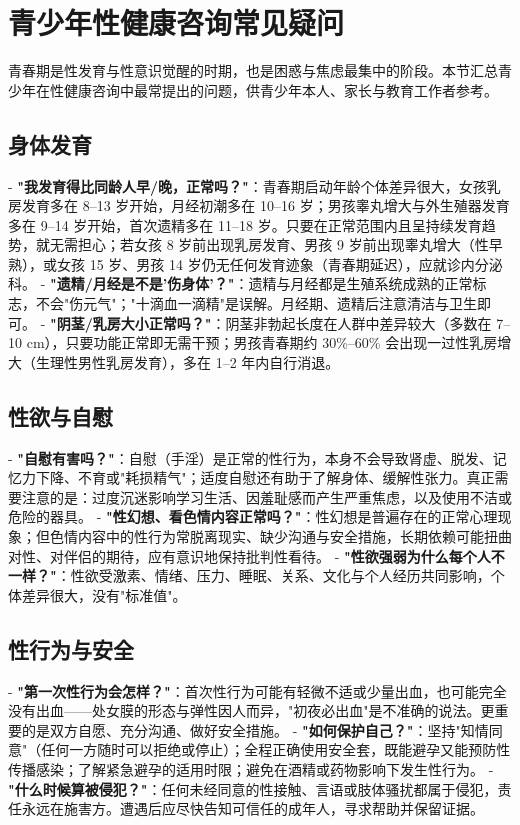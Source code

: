 \section{青少年性健康咨询常见疑问}

青春期是性发育与性意识觉醒的时期，也是困惑与焦虑最集中的阶段。本节汇总青少年在性健康咨询中最常提出的问题，供青少年本人、家长与教育工作者参考。

\subsection{身体发育}

- \textbf{"我发育得比同龄人早/晚，正常吗？"}：青春期启动年龄个体差异很大，女孩乳房发育多在 8--13 岁开始，月经初潮多在 10--16 岁；男孩睾丸增大与外生殖器发育多在 9--14 岁开始，首次遗精多在 11--18 岁。只要在正常范围内且呈持续发育趋势，就无需担心；若女孩 8 岁前出现乳房发育、男孩 9 岁前出现睾丸增大（性早熟），或女孩 15 岁、男孩 14 岁仍无任何发育迹象（青春期延迟），应就诊内分泌科。
- \textbf{"遗精/月经是不是'伤身体'？"}：遗精与月经都是生殖系统成熟的正常标志，不会"伤元气"；"十滴血一滴精"是误解。月经期、遗精后注意清洁与卫生即可。
- \textbf{"阴茎/乳房大小正常吗？"}：阴茎非勃起长度在人群中差异较大（多数在 7--10 cm），只要功能正常即无需干预；男孩青春期约 30\%--60\% 会出现一过性乳房增大（生理性男性乳房发育），多在 1--2 年内自行消退。

\subsection{性欲与自慰}

- \textbf{"自慰有害吗？"}：自慰（手淫）是正常的性行为，本身不会导致肾虚、脱发、记忆力下降、不育或"耗损精气"；适度自慰还有助于了解身体、缓解性张力。真正需要注意的是：过度沉迷影响学习生活、因羞耻感而产生严重焦虑，以及使用不洁或危险的器具。
- \textbf{"性幻想、看色情内容正常吗？"}：性幻想是普遍存在的正常心理现象；但色情内容中的性行为常脱离现实、缺少沟通与安全措施，长期依赖可能扭曲对性、对伴侣的期待，应有意识地保持批判性看待。
- \textbf{"性欲强弱为什么每个人不一样？"}：性欲受激素、情绪、压力、睡眠、关系、文化与个人经历共同影响，个体差异很大，没有"标准值"。

\subsection{性行为与安全}

- \textbf{"第一次性行为会怎样？"}：首次性行为可能有轻微不适或少量出血，也可能完全没有出血——处女膜的形态与弹性因人而异，"初夜必出血"是不准确的说法。更重要的是双方自愿、充分沟通、做好安全措施。
- \textbf{"如何保护自己？"}：坚持"知情同意"（任何一方随时可以拒绝或停止）；全程正确使用安全套，既能避孕又能预防性传播感染；了解紧急避孕的适用时限；避免在酒精或药物影响下发生性行为。
- \textbf{"什么时候算被侵犯？"}：任何未经同意的性接触、言语或肢体骚扰都属于侵犯，责任永远在施害方。遭遇后应尽快告知可信任的成年人，寻求帮助并保留证据。

